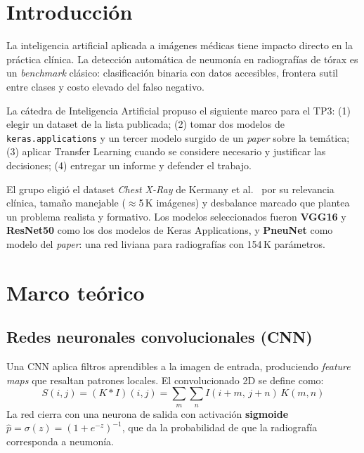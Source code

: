 \documentclass[1p,12pt]{elsarticle}
\begin{document}
\section{Introducción}
\label{sec:intro}

La inteligencia artificial aplicada a imágenes médicas tiene impacto directo en la práctica clínica. La detección automática de neumonía en radiografías de tórax es un \textit{benchmark} clásico: clasificación binaria con datos accesibles, frontera sutil entre clases y costo elevado del falso negativo.

La cátedra de Inteligencia Artificial propuso el siguiente marco para el TP3: (1) elegir un dataset de la lista publicada; (2) tomar dos modelos de \texttt{keras.applications} y un tercer modelo surgido de un \textit{paper} sobre la temática; (3) aplicar Transfer Learning cuando se considere necesario y justificar las decisiones; (4) entregar un informe y defender el trabajo.

El grupo eligió el dataset \textit{Chest X-Ray} de Kermany et al.\ \cite{kermany2018} por su relevancia clínica, tamaño manejable ($\approx$5\,K imágenes) y desbalance marcado que plantea un problema realista y formativo. Los modelos seleccionados fueron \textbf{VGG16} \cite{simonyan2014} y \textbf{ResNet50} \cite{he2015} como los dos modelos de Keras Applications, y \textbf{PneuNet} \cite{saranyaraj2025} como modelo del \textit{paper}: una red liviana para radiografías con 154\,K parámetros.

\section{Marco teórico}
\label{sec:marco}

\subsection{Redes neuronales convolucionales (CNN)}

Una CNN aplica filtros aprendibles a la imagen de entrada, produciendo \textit{feature maps} que resaltan patrones locales. El convolucionado 2D se define como:
\begin{equation}
  S(i,j) = (K * I)(i,j) = \sum_m \sum_n I(i+m,\, j+n)\, K(m,n)
  \label{eq:conv}
\end{equation}
La red cierra con una neurona de salida con activación \textbf{sigmoide} $\hat{p} = \sigma(z) = (1+e^{-z})^{-1}$, que da la probabilidad de que la radiografía corresponda a neumonía.
\end{document}
